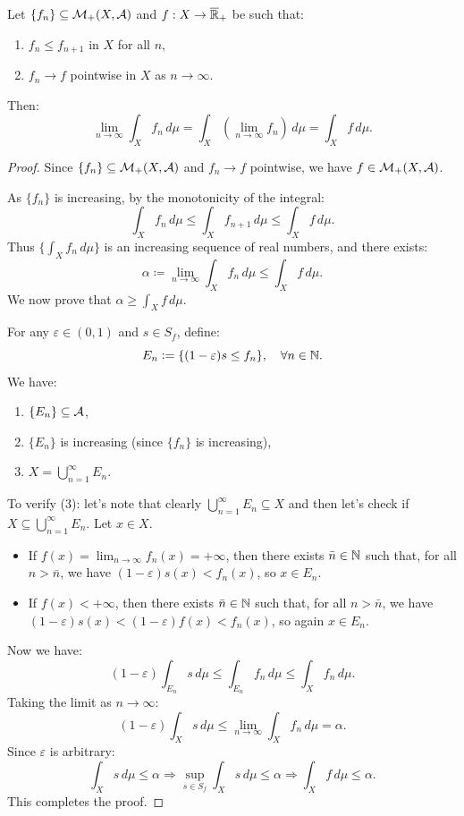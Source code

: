 \clearpage
\begin{theorem}
Let $\{f_n\} \subseteq \mathcal{M}_+(X, \mathcal{A})$ and $f: X \to \overline{\mathbb{R}}_+$ be such that:
\begin{enumerate}
    \item $f_n \leq f_{n+1}$ in $X$ for all $n$,
    \item $f_n \to f$ pointwise in $X$ as $n \to \infty$.
\end{enumerate}
Then:
\[
\lim_{n \to \infty} \int_X f_n \, d\mu = \int_X \left(\lim_{n \to \infty} f_n\right) \, d\mu = \int_X f \, d\mu.
\]
\end{theorem}

\begin{proof}
Since $\{f_n\} \subseteq \mathcal{M}_+(X, \mathcal{A})$ and $f_n \to f$ pointwise, we have $f \in \mathcal{M}_+(X, \mathcal{A})$.

As $\{f_n\}$ is increasing, by the monotonicity of the integral:
\[
\int_X f_n \, d\mu \leq \int_X f_{n+1} \, d\mu \leq \int_X f \, d\mu.
\]
Thus $\{\int_X f_n \, d\mu\}$ is an increasing sequence of real numbers, and there exists:
\[
\alpha \coloneqq \lim_{n \to \infty} \int_X f_n \, d\mu \leq \int_X f \, d\mu.
\]
We now prove that $\alpha \geq \int_X f \, d\mu$.

For any $\varepsilon \in (0,1)$ and $s \in S_f$, define:
\[
E_n \mathrel{\mathop:}= \{(1-\varepsilon)s \leq f_n\}, \quad \forall n \in \mathbb{N}.
\]
We have:
\begin{enumerate}
    \item $\{E_n\} \subseteq \mathcal{A}$,
    \item $\{E_n\}$ is increasing (since $\{f_n\}$ is increasing),
    \item $X = \bigcup_{n=1}^{\infty} E_n$.
\end{enumerate}
To verify (3): let's note that clearly $\bigcup_{n=1}^{\infty} E_n \subseteq X$ and then let's check if $X \subseteq \bigcup_{n=1}^{\infty} E_n$. Let $x \in X$. 
\begin{itemize}
    \item If $f(x) = \lim_{n \to \infty} f_n(x) = +\infty$, then there exists $\bar{n} \in \mathbb{N}$ such that, for all $n > \bar{n}$, we have $(1-\varepsilon)s(x) < f_n(x)$, so $x \in E_n$.
    \item If $f(x) < +\infty$, then there exists $\bar{n} \in \mathbb{N}$ such that, for all $n > \bar{n}$, we have $(1-\varepsilon)s(x) < (1-\varepsilon)f(x) < f_n(x)$, so again $x \in E_n$.
\end{itemize}

Now we have:
\[
(1-\varepsilon) \int_{E_n} s \, d\mu \leq \int_{E_n} f_n \, d\mu \leq \int_X f_n \, d\mu.
\]
Taking the limit as $n \to \infty$:
\[
(1-\varepsilon) \int_X s \, d\mu \leq \lim_{n \to \infty} \int_X f_n \, d\mu = \alpha.
\]
Since $\varepsilon$ is arbitrary:
\[
\int_X s \, d\mu \leq \alpha \Rightarrow \sup_{s \in S_f} \int_X s \, d\mu \leq \alpha \Rightarrow \int_X f \, d\mu \leq \alpha.
\]
This completes the proof.
\end{proof}

